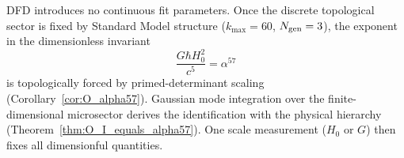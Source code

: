 \begin{tcolorbox}[colback=blue!5!white, colframe=blue!60!black, title=Zero Continuous Parameters --- Spectral-Action-Derived (Appendix~\ref{app:O_alpha57_clean})]
DFD introduces no continuous fit parameters. Once the discrete topological sector is fixed by Standard Model structure ($k_{\max} = 60$, $N_{\rm gen} = 3$), the exponent in the dimensionless invariant
\begin{equation}
\frac{G\hbar H_0^2}{c^5} = \alpha^{57}
\end{equation}
is topologically forced by primed-determinant scaling (Corollary~\ref{cor:O_alpha57}). Gaussian mode integration over the finite-dimensional microsector derives the identification with the physical hierarchy (Theorem~\ref{thm:O_I_equals_alpha57}). One scale measurement ($H_0$ or $G$) then fixes all dimensionful quantities.
\end{tcolorbox}

